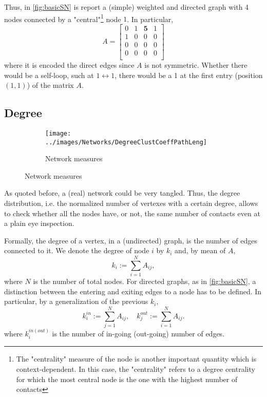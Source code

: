 \documentclass[a4paper,10pt]{book} %
\theoremstyle{definition}
\begin{document}
Thus, in \autoref{fig:basicSN} is report a (simple) weighted and directed graph with 4 nodes connected by a "central"\footnote{The "centrality" measure of the node is another important quantity which is context-dependent. In this case, the "centrality" refers to a degree centrality for which the most central node is the one with the highest number of contacts} node $1$.
In particular,
\[
A = 
\begin{bmatrix}
0 & 1 & \textbf{5} & 1 \\
1 & 0 & 0 & 0 \\
0 & 0 & 0 & 0 \\
0 & 0 & 0 & 0 \\ 
\end{bmatrix}
\]
where it is encoded the direct edges since $A$ is not symmetric. Whether there would be a self-loop, such at $ 1 \longleftrightarrow 1 $, there would be a 1 at the first entry (position $(1,1)$) of the matrix $A$.

\subsection{Degree}

\begin{figure}[ht]
    \begin{subfigure}{\textwidth}
        \texttt{[image: ../images/Networks/DegreeClustCoeffPathLeng]}
        \centering
        \caption{Network measures \cite{Olaf:2011_NonRandomBrain}}
        \label{fig:degree_clustcoefficient_pathlength}
    \end{subfigure}
\end{figure}
As quoted before, a (real) network could be very tangled. Thus, the degree distribution, i.e. the normalized number of vertexes with a certain degree, allows to check whether all the nodes have, or not, the same number of contacts even at a plain eye inspection. 

Formally, the degree of a vertex, in a (undirected) graph, is the number of edges connected to it. We denote the degree of node $i$ by $k_i$ and, by mean of $A$, $$k_i := \sum_{i=1}^{N} A_{ij},$$ where $N$ is the number of total nodes.
For directed graphs, as in \autoref{fig:basicSN}, a distinction between the entering and exiting edges to a node has to be defined. In particular, by a generalization of the previous $k_i$, 
\begin{equation}
	k_i^{in} := \sum_{j=1}^N A_{ij}, \quad k_j^{out} := \sum_{i=1}^N A_{ij}.
	\label{eq:kin_kout}	
\end{equation}
where $k_i^{in(out)}$ is the number of in-going (out-going) number of edges. 
\end{document}
